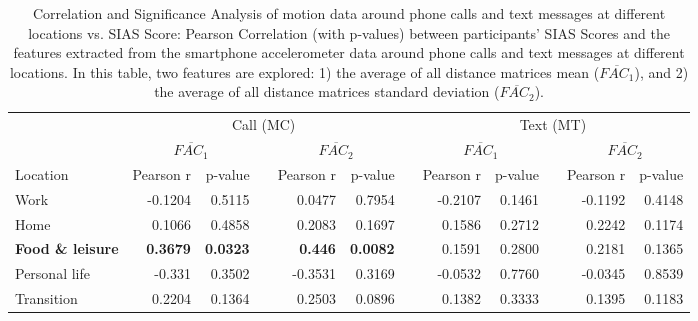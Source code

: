 \begin{table}[b]
\caption{Correlation and Significance Analysis of motion data around phone calls and text messages at different locations vs. SIAS Score: Pearson Correlation (with p-values) between participants' SIAS Scores and the features extracted from the smartphone accelerometer data around phone calls and text messages at different locations. In this table, two features are explored: 1) the average of all distance matrices mean ($\overline{FAC_1}$), and 2) the average of all distance matrices standard deviation ($\overline{FAC_2}$).
\label{tab:pearson_matrix_call_text_GPS}}
\begin{center}
\small
\def\arraystretch{1.5}
	\begin{tabular}{ l @{\hskip 0.5in} r r r r r r r r r r r}
    \toprule
									& \multicolumn{5}{c}{Call (MC)}																		&	& \multicolumn{5}{c}{Text (MT)} \\
        \cline{2-6} \cline{8-12}
        							& \multicolumn{2}{c}{$\overline{FAC_1}$} 			&	& \multicolumn{2}{c}{$\overline{FAC_2}$}			&	& \multicolumn{2}{c}{$\overline{FAC_1}$} 	&	& \multicolumn{2}{c}{$\overline{FAC_2}$}	\\
        \cline{2-3} \cline{5-6} \cline{8-9} \cline{11-12}
    	Location					& Pearson r			& p-value					&	& Pearson r			& p-value				&	& Pearson r			& p-value					&	& Pearson r			& p-value			\\
        \hline
        Work						& -0.1204			& 0.5115					&	& 0.0477			& 0.7954				&	& -0.2107			& 0.1461					&	& -0.1192			& 0.4148			\\
         Home				       & 0.1066	                & 0.4858			    &	& 0.2083	        & 0.1697		&	& 0.1586	& 0.2712			&	& 0.2242	& 0.1174	\\
        \textbf{Food \& leisure}			& \textbf{0.3679}			& \textbf{0.0323}					&	&\textbf{ 0.446}			& \textbf{0.0082}				&	& 0.1591			& 0.2800					&	& 0.2181			& 0.1365			\\
        Personal life				& -0.331			& 0.3502					&	& -0.3531			& 0.3169				&	& -0.0532			& 0.7760					&	& -0.0345			& 0.8539			\\
        Transition					& 0.2204			& 0.1364					&	& 0.2503			& 0.0896				&	& 0.1382			& 0.3333					&	& 0.1395			& 0.1183			\\
	\bottomrule
    \end{tabular}
\end{center}
\end{table}


